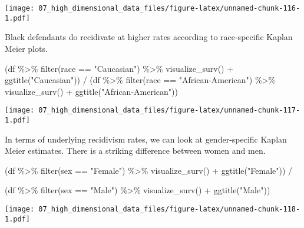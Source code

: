 \documentclass[
]{book}
\newenvironment{Shaded}{\begin{snugshade}}{\end{snugshade}}
\newcommand{\FunctionTok}[1]{\textcolor[rgb]{0.00,0.00,0.00}{#1}}
\newcommand{\NormalTok}[1]{#1}
\newcommand{\SpecialCharTok}[1]{\textcolor[rgb]{0.00,0.00,0.00}{#1}}
\newcommand{\StringTok}[1]{\textcolor[rgb]{0.31,0.60,0.02}{#1}}
\begin{document}
\texttt{[image: 07\_high\_dimensional\_data\_files/figure-latex/unnamed-chunk-116-1.pdf]}

Black defendants do recidivate at higher rates according to race-specific Kaplan Meier plots.

\begin{Shaded}
\begin{Highlighting}[]
\NormalTok{(df }\SpecialCharTok{\%\textgreater{}\%} \FunctionTok{filter}\NormalTok{(race }\SpecialCharTok{==} \StringTok{"Caucasian"}\NormalTok{) }\SpecialCharTok{\%\textgreater{}\%} \FunctionTok{visualize\_surv}\NormalTok{() }\SpecialCharTok{+} \FunctionTok{ggtitle}\NormalTok{(}\StringTok{"Caucasian"}\NormalTok{)) }\SpecialCharTok{/}
\NormalTok{(df }\SpecialCharTok{\%\textgreater{}\%} \FunctionTok{filter}\NormalTok{(race }\SpecialCharTok{==} \StringTok{"African{-}American"}\NormalTok{) }\SpecialCharTok{\%\textgreater{}\%} \FunctionTok{visualize\_surv}\NormalTok{() }\SpecialCharTok{+} \FunctionTok{ggtitle}\NormalTok{(}\StringTok{"African{-}American"}\NormalTok{)) }
\end{Highlighting}
\end{Shaded}

\texttt{[image: 07\_high\_dimensional\_data\_files/figure-latex/unnamed-chunk-117-1.pdf]}

In terms of underlying recidivism rates, we can look at gender-specific Kaplan Meier estimates. There is a striking difference between women and men.

\begin{Shaded}
\begin{Highlighting}[]
\NormalTok{(df }\SpecialCharTok{\%\textgreater{}\%} \FunctionTok{filter}\NormalTok{(sex }\SpecialCharTok{==} \StringTok{"Female"}\NormalTok{) }\SpecialCharTok{\%\textgreater{}\%} \FunctionTok{visualize\_surv}\NormalTok{() }\SpecialCharTok{+} \FunctionTok{ggtitle}\NormalTok{(}\StringTok{"Female"}\NormalTok{)) }\SpecialCharTok{/}

\NormalTok{(df }\SpecialCharTok{\%\textgreater{}\%} \FunctionTok{filter}\NormalTok{(sex }\SpecialCharTok{==} \StringTok{"Male"}\NormalTok{) }\SpecialCharTok{\%\textgreater{}\%} \FunctionTok{visualize\_surv}\NormalTok{() }\SpecialCharTok{+} \FunctionTok{ggtitle}\NormalTok{(}\StringTok{"Male"}\NormalTok{))}
\end{Highlighting}
\end{Shaded}

\texttt{[image: 07\_high\_dimensional\_data\_files/figure-latex/unnamed-chunk-118-1.pdf]}
\end{document}
